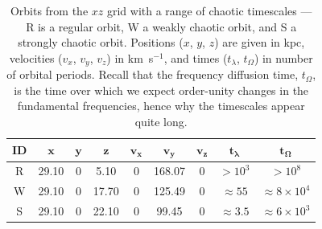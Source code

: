 \documentclass[letterpaper,12pt,preprint]{aastex}
\newcommand{\bs}[1]{\boldsymbol{#1}}
\begin{document}
\begin{table}[ht]
\begin{center}
	\begin{tabular}{c | c c c c c c | c c }
		{\bf ID} & $\bs{x}$ & $\bs{y}$ & $\bs{z}$ & $\bs{v_x}$ & $\bs{v_y}$ & $\bs{v_z}$ & $\bs{t_\lambda}$ & $\bs{t_\Omega}$ \\\toprule
		R & 29.10 & 0 & 5.10 & 0 & 168.07 & 0 & $>10^3$ & $>10^8$\\
		\midrule
		W & 29.10 & 0 & 17.70 & 0 & 125.49 & 0 & $\approx55$ & $\approx8 \times 10^4$\\
		\midrule
		S & 29.10 & 0 & 22.10 & 0 & 99.45 & 0 & $\approx3.5$ & $\approx6 \times 10^3$\\
		\bottomrule
		\end{tabular}
	\caption{Orbits from the $xz$ grid with a range of chaotic timescales --- R is a regular orbit, W a weakly chaotic orbit, and S a strongly chaotic orbit. Positions ($x$, $y$, $z$) are given in kpc, velocities ($v_x$, $v_y$, $v_z$) in km~s$^{-1}$, and times ($t_\lambda$, $t_\Omega$) in number of orbital periods. Recall that the frequency diffusion time, $t_\Omega$, is the time over which we expect order-unity changes in the fundamental frequencies, hence why the timescales appear quite long. \label{tbl:three-orbits}}
\end{center}
\end{table}
\end{document}
